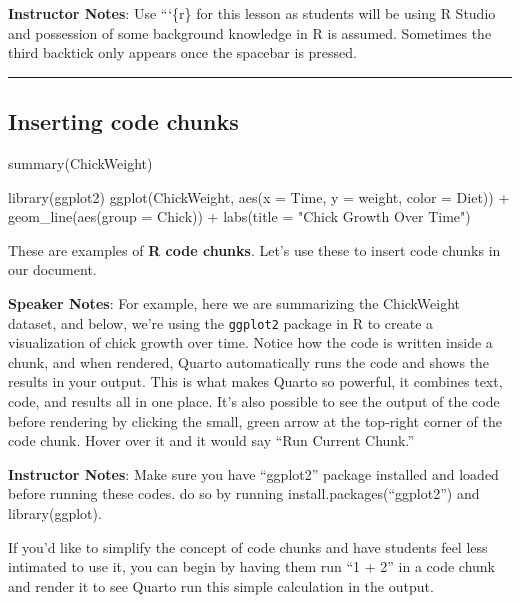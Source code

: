 \documentclass[
  letterpaper,
  DIV=11,
  numbers=noendperiod]{scrartcl}
\newenvironment{Shaded}{\begin{snugshade}}{\end{snugshade}}
\newcommand{\NormalTok}[1]{\textcolor[rgb]{0.00,0.23,0.31}{#1}}
\begin{document}
\textbf{Instructor Notes}: Use ```\{r\} for this lesson as students will
be using R Studio and possession of some background knowledge in R is
assumed. Sometimes the third backtick only appears once the spacebar is
pressed.

\begin{center}\rule{0.5\linewidth}{0.5pt}\end{center}

\subsection{Inserting code chunks}\label{inserting-code-chunks}

\begin{Shaded}
\begin{Highlighting}[]
\NormalTok{summary(ChickWeight)}
\end{Highlighting}
\end{Shaded}

\begin{Shaded}
\begin{Highlighting}[]
\NormalTok{library(ggplot2)}
\NormalTok{ggplot(ChickWeight, aes(x = Time, y = weight, color = Diet)) +}
\NormalTok{  geom\_line(aes(group = Chick)) +}
\NormalTok{  labs(title = "Chick Growth Over Time")}
\end{Highlighting}
\end{Shaded}

These are examples of \textbf{R code chunks}. Let's use these to insert
code chunks in our document.

\textbf{Speaker Notes}: For example, here we are summarizing the
ChickWeight dataset, and below, we're using the \texttt{ggplot2} package
in R to create a visualization of chick growth over time. Notice how the
code is written inside a chunk, and when rendered, Quarto automatically
runs the code and shows the results in your output. This is what makes
Quarto so powerful, it combines text, code, and results all in one
place. It's also possible to see the output of the code before rendering
by clicking the small, green arrow at the top-right corner of the code
chunk. Hover over it and it would say ``Run Current Chunk.''

\textbf{Instructor Notes}: Make sure you have ``ggplot2'' package
installed and loaded before running these codes. do so by running
install.packages(``ggplot2'') and library(ggplot).

If you'd like to simplify the concept of code chunks and have students
feel less intimated to use it, you can begin by having them run ``1 +
2'' in a code chunk and render it to see Quarto run this simple
calculation in the output.
\end{document}
